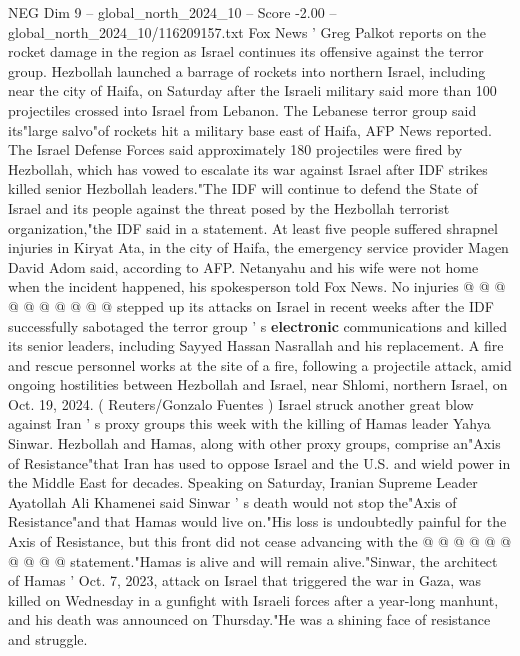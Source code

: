 \begin{textsample}{NEG Dim 9 – global\_north\_2024\_10 – Score -2.00 – global\_north\_2024\_10/116209157.txt}  \label{ex:f9_neg_230}
Fox News ' Greg Palkot reports on the rocket damage in the region as Israel continues its offensive against the terror group.
Hezbollah launched a barrage of rockets into northern Israel, including near the city of Haifa, on Saturday after the Israeli military said more than 100 projectiles crossed into Israel from Lebanon.
The Lebanese terror group said its"large salvo"of rockets hit a military base east of Haifa, AFP News reported.
The Israel Defense Forces said approximately 180 projectiles were fired by Hezbollah, which has vowed to escalate its war against Israel after IDF strikes killed senior Hezbollah leaders."The IDF will continue to defend the State of Israel and its people against the threat posed by the Hezbollah terrorist organization,"the IDF said in a statement.
At least five people suffered shrapnel injuries in Kiryat Ata, in the city of Haifa, the emergency service provider Magen David Adom said, according to AFP.
Netanyahu and his wife were not home when the incident happened, his spokesperson told Fox News.
No injuries @ @ @ @ @ @ @ @ @ @ stepped up its attacks on Israel in recent weeks after the IDF successfully sabotaged the terror group ' s \textbf{electronic} communications and killed its senior leaders, including Sayyed Hassan Nasrallah and his replacement.
A fire and rescue personnel works at the site of a fire, following a projectile attack, amid ongoing hostilities between Hezbollah and Israel, near Shlomi, northern Israel, on Oct. 19, 2024. ( Reuters/Gonzalo Fuentes ) Israel struck another great blow against Iran ' s proxy groups this week with the killing of Hamas leader Yahya Sinwar.
Hezbollah and Hamas, along with other proxy groups, comprise an"Axis of Resistance"that Iran has used to oppose Israel and the U.S. and wield power in the Middle East for decades.
Speaking on Saturday, Iranian Supreme Leader Ayatollah Ali Khamenei said Sinwar ' s death would not stop the"Axis of Resistance"and that Hamas would live on."His loss is undoubtedly painful for the Axis of Resistance, but this front did not cease advancing with the @ @ @ @ @ @ @ @ @ @ statement."Hamas is alive and will remain alive."Sinwar, the architect of Hamas ' Oct. 7, 2023, attack on Israel that triggered the war in Gaza, was killed on Wednesday in a gunfight with Israeli forces after a year-long manhunt, and his death was announced on Thursday."He was a shining face of resistance and struggle.

\end{textsample}
